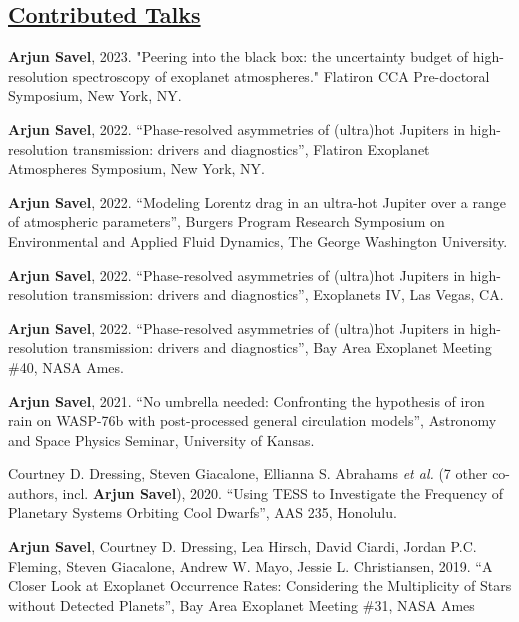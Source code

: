 \documentclass[letterpaper,10.5pt]{article}
\newcommand{\shortershorterSection}[1]{\vspace{-10pt}\subsection{#1}}
\begin{document}
\shortershorterSection{\underline{Contributed Talks}}

\small
  \begin{list}{}{\cvlist}
  

  \item[{\color{numcolor}\scriptsize10}] \textbf{Arjun Savel}, 2023. "Peering into the black box: 
the uncertainty budget of high-resolution spectroscopy of exoplanet atmospheres." Flatiron CCA Pre-doctoral Symposium, New York, NY.

\item[{\color{numcolor}\scriptsize9}] \textbf{Arjun Savel}, 2022. ``Phase-resolved asymmetries of (ultra)hot Jupiters in high-resolution transmission: drivers and diagnostics'', Flatiron Exoplanet Atmospheres Symposium, New York, NY.

  \item[{\color{numcolor}\scriptsize8}] \textbf{Arjun Savel}, 2022. ``Modeling Lorentz drag in an ultra-hot Jupiter over a range of atmospheric parameters'', Burgers Program Research Symposium on Environmental and Applied Fluid Dynamics, The George Washington University.

     \item[{\color{numcolor}\scriptsize7}] \textbf{Arjun Savel}, 2022. ``Phase-resolved asymmetries of (ultra)hot Jupiters in high-resolution transmission: drivers and diagnostics'', Exoplanets IV, Las Vegas, CA.


   \item[{\color{numcolor}\scriptsize6}] \textbf{Arjun Savel}, 2022. ``Phase-resolved asymmetries of (ultra)hot Jupiters in high-resolution transmission: drivers and diagnostics'', Bay Area Exoplanet Meeting \#40, NASA Ames.


\item[{\color{numcolor}\scriptsize5}] \textbf{Arjun Savel}, 2021. ``No umbrella needed: Confronting the hypothesis of iron rain on WASP-76b with post-processed general circulation models'', Astronomy and Space Physics Seminar, University of Kansas.


\item[{\color{numcolor}\scriptsize4}] Courtney D. Dressing, Steven Giacalone, Ellianna S. Abrahams \emph{et al.} (7 other co-authors, incl. \textbf{Arjun Savel}), 2020. ``Using TESS to Investigate the Frequency of Planetary Systems Orbiting Cool Dwarfs'', AAS 235, Honolulu.


\item[{\color{numcolor}\scriptsize3}] \textbf{Arjun Savel}, Courtney D. Dressing, Lea Hirsch, David Ciardi, Jordan P.C. Fleming, Steven Giacalone, Andrew W. Mayo, Jessie L. Christiansen, 2019. “A Closer Look at Exoplanet Occurrence Rates: Considering the Multiplicity of Stars without Detected Planets”, Bay Area Exoplanet Meeting \#31, NASA Ames


\end{list}
\end{document}
